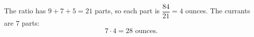 The ratio has $9+7+5=21$ parts, so each part is $\dfrac{84}{21}=4$ ounces. The currants are $7$ parts:
\[
7\cdot4=\boxed{28\text{ ounces}}.
\]
